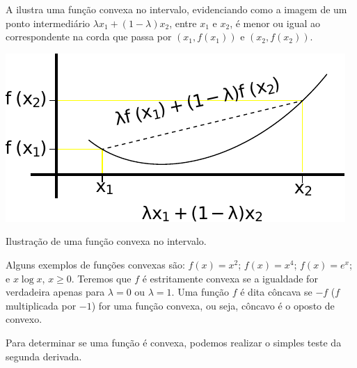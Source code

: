 A  ilustra uma função convexa no intervalo, evidenciando
como a imagem de um ponto intermediário $\lambda x_1 + (1 - \lambda)x_2$, entre
$x_1$ e $x_2$, é menor ou igual ao correspondente na corda que passa por $(x_1,f(x_1))$
e $(x_2,f(x_2))$.

\begin{marginfigure}%
  \includegraphics[width=\linewidth]{figures/funcao-convexa.pdf}
  \caption{Ilustração de uma função convexa no intervalo.}
  \label{fig:funcao-convexa}
\end{marginfigure}

Alguns exemplos de funções convexas são: $f(x)=x^2$; $f(x)=x^4$; $f(x)=e^x$; e $x \log x$, $x \geq 0$.
Teremos que $f$ é estritamente convexa se a igualdade for verdadeira apenas para $\lambda = 0$ ou $\lambda = 1$.
Uma função $f$ é dita côncava se $-f$ ($f$ multiplicada por $-1$) for uma função convexa, ou seja,
côncavo é o oposto de convexo.

Para determinar se uma função é convexa, podemos realizar o simples teste da segunda derivada.


